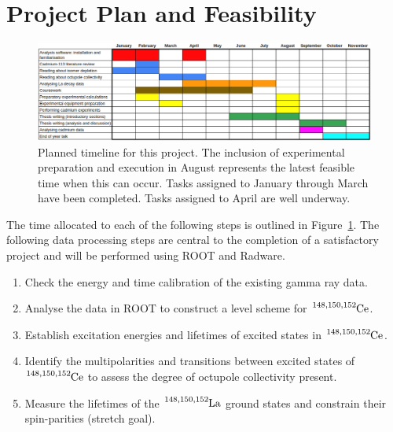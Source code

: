 \documentclass[12pt,a4paper]{article}
\begin{document}


\section*{Project Plan and Feasibility}
\begin{figure}[htbp]
	\centering
	\includegraphics[width=\textwidth]{gantt}
	\caption{Planned timeline for this project. The inclusion of experimental preparation and execution in August represents the latest feasible time when this can occur. Tasks assigned to January through March have been completed. Tasks assigned to April are well underway.}
\label{fig:gantt}
\end{figure}

\medskip
\noindent
The time allocated to each of the following steps is outlined in Figure~\ref{fig:gantt}.
The following data processing steps are central to the completion of a satisfactory project and will be performed using ROOT and Radware.
\begin{enumerate}
\item Check the energy and time calibration of the existing gamma ray data. %
\item Analyse the data in ROOT to construct a level scheme for $\ce{^{148,150,152}Ce}$.
\item Establish excitation energies and lifetimes of excited states in $\ce{^{148,150,152}Ce}$.
\item Identify the multipolarities and transitions between excited states of $\ce{^{148,150,152}Ce}$ to assess the degree of octupole collectivity present.
\item Measure the lifetimes of the $\ce{^{148,150,152}La}$ ground states and constrain their spin-parities (stretch goal).
\end{enumerate}
\end{document}
